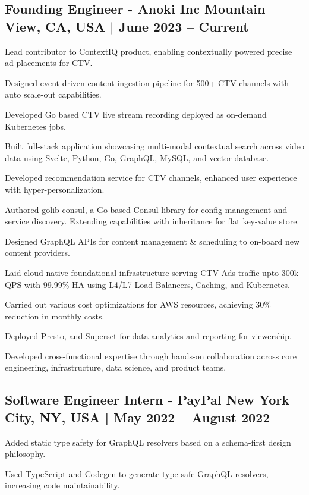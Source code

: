 \subsection{{Founding Engineer - Anoki Inc \hfill  Mountain View, CA, USA  | June 2023 -- Current}}
\begin{zitemize}
\item Lead contributor to ContextIQ product, enabling contextually powered precise ad-placements for CTV.
\item Designed event-driven content ingestion pipeline for 500+ CTV channels with auto scale-out capabilities.
\item Developed Go based CTV live stream recording deployed as on-demand Kubernetes jobs.
\item Built full-stack application showcasing multi-modal contextual search across video data using Svelte, Python, Go, GraphQL, MySQL, and vector database.
\item Developed recommendation service for CTV channels, enhanced user experience with hyper-personalization.
\item Authored golib-consul, a Go based Consul library for config management and service discovery. Extending capabilities with inheritance for flat key-value store.
\item Designed GraphQL APIs for content management \& scheduling to on-board new content providers.
\item Laid cloud-native foundational infrastructure serving CTV Ads traffic upto 300k QPS with 99.99\% HA using L4/L7 Load Balancers, Caching, and Kubernetes.
\item Carried out various cost optimizations for AWS resources, achieving 30\% reduction in monthly costs.
\item Deployed Presto, and Superset for data analytics and reporting for viewership.
\item Developed cross-functional expertise through hands-on collaboration across core engineering, infrastructure, data science, and product teams.
\end{zitemize}

\subsection{{Software Engineer Intern - PayPal \hfill New York City, NY, USA | May 2022 -- August 2022}}
\begin{zitemize}
\item Added static type safety for GraphQL resolvers based on a schema-first design philosophy.
\item Used TypeScript and Codegen to generate type-safe GraphQL resolvers, increasing code maintainability.
\end{zitemize}


